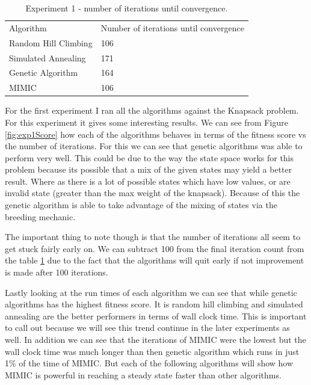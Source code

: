 \documentclass[
letterpaper, %
]{IEEEtran}
\begin{document}
	\begin{center}
		\begin{table}
			\begin{tabular}{ll}
				Algorithm            & Number of iterations until convergence \\
				Random Hill Climbing & 106                                    \\
				Simulated Annealing  & 171                                    \\
				Genetic Algorithm    & 164                                    \\
				MIMIC                & 106                                   
			\end{tabular}
			\caption{Experiment 1 - number of iterations until convergence.}
			\label{table:exp1data}
		\end{table}
	\end{center}

	For the first experiment I ran all the algorithms against the Knapsack problem. For this experiment it gives some interesting results. We can see from Figure \ref{fig:exp1Score} how each of the algorithms behaves in terms of the fitness score vs the number of iterations. For this we can see that genetic algorithms was able to perform very well. This could be due to the way the state space works for this problem because its possible that a mix of the given states may yield a better result. Where as there is a lot of possible states which have low values, or are invalid state (greater than the max weight of the knapsack). Because of this the genetic algorithm is able to take advantage of the mixing of states via the breeding mechanic.
	
	The important thing to note though is that the number of iterations all seem to get stuck fairly early on. We can subtract 100 from the final iteration count from the table \ref{table:exp1data} due to the fact that the algorithms will quit early if not improvement is made after 100 iterations.
	
	Lastly looking at the run times of each algorithm we can see that while genetic algorithms has the highest fitness score. It is random hill climbing and simulated annealing are the better performers in terms of wall clock time. This is important to call out because we will see this trend continue in the later experiments as well. In addition we can see that the iterations of MIMIC were the lowest but the wall clock time was much longer than then genetic algorithm which runs in just 1\% of the time of MIMIC. But each of the following algorithms will show how MIMIC is powerful in reaching a steady state faster than other algorithms.
\end{document}

